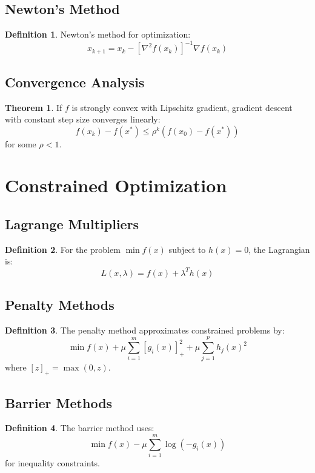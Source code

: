 \documentclass[11pt]{article}
\theoremstyle{definition}
\newtheorem{definition}{Definition}[section]
\newtheorem{theorem}{Theorem}[section]
\begin{document}
\subsection{Newton's Method}
\begin{definition}
Newton's method for optimization:
$$x_{k+1} = x_k - [\nabla^2 f(x_k)]^{-1} \nabla f(x_k)$$
\end{definition}

\subsection{Convergence Analysis}
\begin{theorem}
If $f$ is strongly convex with Lipschitz gradient, gradient descent with constant step size converges linearly:
$$f(x_k) - f(x^*) \leq \rho^k (f(x_0) - f(x^*))$$
for some $\rho < 1$.
\end{theorem}

\section{Constrained Optimization}

\subsection{Lagrange Multipliers}
\begin{definition}
For the problem $\min f(x)$ subject to $h(x) = 0$, the Lagrangian is:
$$L(x, \lambda) = f(x) + \lambda^T h(x)$$
\end{definition}

\subsection{Penalty Methods}
\begin{definition}
The penalty method approximates constrained problems by:
$$\min f(x) + \mu \sum_{i=1}^m [g_i(x)]_+^2 + \mu \sum_{j=1}^p h_j(x)^2$$
where $[z]_+ = \max(0, z)$.
\end{definition}

\subsection{Barrier Methods}
\begin{definition}
The barrier method uses:
$$\min f(x) - \mu \sum_{i=1}^m \log(-g_i(x))$$
for inequality constraints.
\end{definition}
\end{document}
